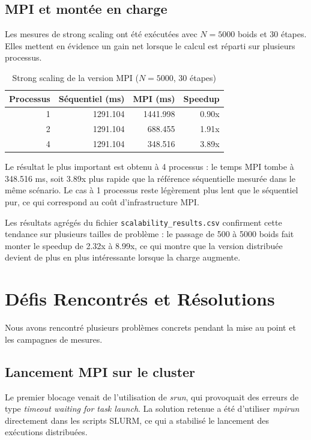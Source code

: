 \documentclass[conference]{IEEEtran}
\begin{document}
\subsection{MPI et montée en charge}
Les mesures de strong scaling ont été exécutées avec $N = 5000$ boids et 30 étapes. Elles mettent en évidence un gain net lorsque le calcul est réparti sur plusieurs processus.

\begin{table}[h]
	\centering
	\caption{Strong scaling de la version MPI ($N=5000$, 30 étapes)}
	\begin{tabular}{|r|r|r|r|}
		\hline
		\textbf{Processus} & \textbf{Séquentiel (ms)} & \textbf{MPI (ms)} & \textbf{Speedup} \\
		\hline
		1                  & 1291.104                 & 1441.998          & 0.90x            \\
		2                  & 1291.104                 & 688.455           & 1.91x            \\
		4                  & 1291.104                 & 348.516           & 3.89x            \\
		\hline
	\end{tabular}
	\label{tab:perf_mpi}
\end{table}

Le résultat le plus important est obtenu à 4 processus : le temps MPI tombe à 348.516 ms, soit 3.89x plus rapide que la référence séquentielle mesurée dans le même scénario. Le cas à 1 processus reste légèrement plus lent que le séquentiel pur, ce qui correspond au coût d'infrastructure MPI.

Les résultats agrégés du fichier \texttt{scalability\_results.csv} confirment cette tendance sur plusieurs tailles de problème : le passage de 500 à 5000 boids fait monter le speedup de 2.32x à 8.99x, ce qui montre que la version distribuée devient de plus en plus intéressante lorsque la charge augmente.

\section{Défis Rencontrés et Résolutions}
Nous avons rencontré plusieurs problèmes concrets pendant la mise au point et les campagnes de mesures.

\subsection{Lancement MPI sur le cluster}
Le premier blocage venait de l'utilisation de \textit{srun}, qui provoquait des erreurs de type \textit{timeout waiting for task launch}. La solution retenue a été d'utiliser \textit{mpirun} directement dans les scripts SLURM, ce qui a stabilisé le lancement des exécutions distribuées.
\end{document}
